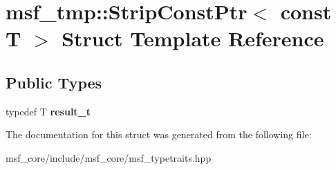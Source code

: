 \hypertarget{structmsf__tmp_1_1StripConstPtr_3_01const_01T_01_4}{\section{msf\-\_\-tmp\-:\-:Strip\-Const\-Ptr$<$ const T $>$ Struct Template Reference}
\label{structmsf__tmp_1_1StripConstPtr_3_01const_01T_01_4}
}
\subsection*{Public Types}
\begin{DoxyCompactItemize}
\item 
\hypertarget{structmsf__tmp_1_1StripConstPtr_3_01const_01T_01_4_a1c31b8f2ab8c3e038d6c0e1cd5857d18}{typedef T {\bfseries result\-\_\-t}}\label{structmsf__tmp_1_1StripConstPtr_3_01const_01T_01_4_a1c31b8f2ab8c3e038d6c0e1cd5857d18}

\end{DoxyCompactItemize}


The documentation for this struct was generated from the following file\-:\begin{DoxyCompactItemize}
\item 
msf\-\_\-core/include/msf\-\_\-core/msf\-\_\-typetraits.\-hpp\end{DoxyCompactItemize}
